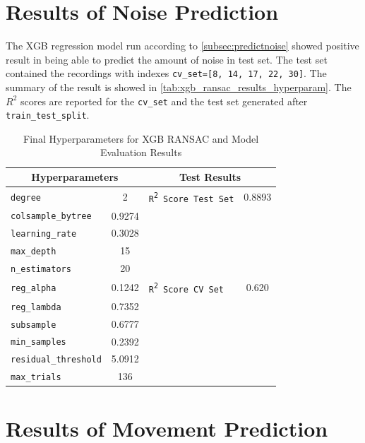 \documentclass{iutbscthesis}
\begin{document}
\section{Results of Noise Prediction}
The XGB regression model run according to \autoref{subsec:predictnoise} showed positive result in being able to predict the amount of noise in test set. The test set contained the recordings with indexes \texttt{cv\_set=[8, 14, 17, 22, 30]}. The summary of the result is showed in \autoref{tab:xgb_ransac_results_hyperparam}. The $R^2$ scores are reported for the \texttt{cv\_set} and the test set generated after \texttt{train\_test\_split}.
\begin{table}[htbp]
\centering
\caption{Final Hyperparameters for XGB RANSAC and Model Evaluation Results}
\label{tab:xgb_ransac_results_hyperparam}
\begin{tabular}{|l|c||l|c|}
    \hline
        \multicolumn{2}{|c||}{\textbf{Hyperparameters}} & \multicolumn{2}{c|}{\textbf{Test Results}} \\
        \hline
        \texttt{degree} & 2 & \texttt{R\textsuperscript{2} Score Test Set} & 0.8893 \\
        \texttt{colsample\_bytree} & 0.9274 &  & \\
        \texttt{learning\_rate} & 0.3028 & & \\
        \texttt{max\_depth} & 15 & & \\
        \texttt{n\_estimators} & 20 & & \\
        \texttt{reg\_alpha} & 0.1242 & \texttt{R\textsuperscript{2} Score CV Set} & 0.620 \\
        \texttt{reg\_lambda} & 0.7352 & & \\
        \texttt{subsample} & 0.6777 & & \\
        \texttt{min\_samples} & 0.2392 & & \\
        \texttt{residual\_threshold} & 5.0912 & & \\
        \texttt{max\_trials} & 136 & & \\
        \hline
    \end{tabular}
\end{table}

\section{Results of Movement Prediction}
\end{document}
